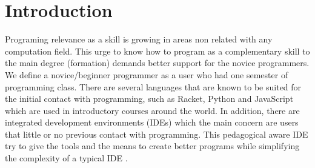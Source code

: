 \section{Introduction}




Programing relevance as a skill is growing in areas non related with any computation field.  %
This urge to know how to program as a complementary skill %
to the main degree (formation) demands better support for the novice programmers.
We define a novice/beginner programmer as a user who had one semester of programming class. %
There are several languages that are known to be suited for the initial contact %
with programming, such as Racket, Python and JavaScript which are used in introductory
courses around the world.
In addition, there are integrated development environments (IDEs) which the main
concern are users that little or no previous contact with programming\cite{kolling2003bluej}. %
This pedagogical %
aware IDE try to give the tools and the means to create better programs while simplifying
the complexity of a typical IDE \cite{pears2007survey}.%


